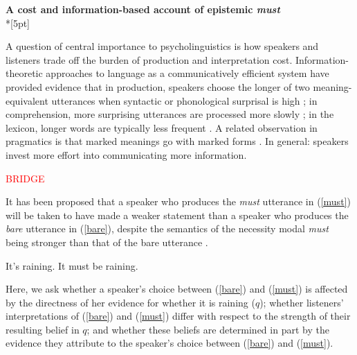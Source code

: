 \documentclass[11pt]{article}
\newcommand{\red}[1]{\textcolor{Red}{#1}}
\begin{document}
\begin{center}\textbf{A cost and information-based account of epistemic \textit{must}}\\*[5pt]
\end{center}

\vspace{-11pt}


A question of central importance to psycholinguistics is how speakers and listeners trade off the burden of production and interpretation cost. Information-theoretic approaches to language as a communicatively efficient system have provided evidence that in production, speakers choose the longer of two meaning-equivalent utterances when syntactic or phonological surprisal is high \cite{jaeger2010, ailed and turk 2004}; in comprehension, more surprising utterances are processed more slowly \cite{levy2008}; in the lexicon, longer words are typically less frequent \cite{zipf, piantadosi}. A related observation in pragmatics is that marked meanings go with marked forms \cite{horn}. In general: speakers invest more effort into communicating more information.

\red{BRIDGE}

It has been proposed that a speaker who produces the \textit{must} utterance in (\ref{must}) will be taken to have made a weaker statement than a speaker who produces the \textit{bare} utterance in (\ref{bare}), despite the semantics of the necessity modal \textit{must} being stronger than that of the bare utterance \cite{XXX}.

\begin{exe}
\ex\label{bare}  It's raining.
\ex\label{must} It must be raining.
\end{exe}

Here, we ask whether a speaker's choice between (\ref{bare}) and (\ref{must}) is affected by the directness of her evidence for whether it is raining ($q$); whether listeners' interpretations of  (\ref{bare}) and (\ref{must})  differ with respect to the strength of their resulting belief in $q$; and whether these beliefs are determined in part by the evidence they attribute to the speaker's choice between (\ref{bare}) and (\ref{must}).
\end{document}
